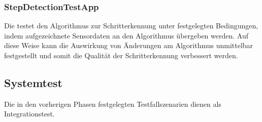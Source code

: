 \documentclass[../validierung.tex]{subfiles}
\begin{document}
\subsubsection{StepDetectionTestApp}
Die  testet den Algorithmus zur Schritterkennung unter festgelegten Bedingungen, indem aufgezeichnete Sensordaten an den Algorithmus übergeben werden.
Auf diese Weise kann die Auswirkung von Änderungen am Algorithmus unmittelbar festgestellt und somit die Qualität der Schritterkennung verbessert werden.

\subsection{Systemtest}
Die in den vorherigen Phasen festgelegten Testfallszenarien dienen als Integrationstest.
\end{document}
